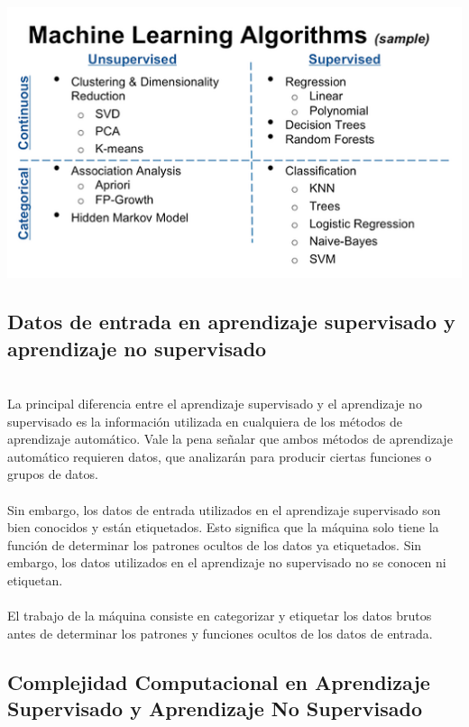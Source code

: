 \documentclass[11pt,a4paper]{article}
\begin{document}
	    \begin{center}	\includegraphics[scale=0.9]{./Imagenes/Diferencias}	
		\end{center}
	
		\subsection{Datos de entrada en aprendizaje supervisado y aprendizaje no supervisado}
		
		\\La principal diferencia entre el aprendizaje supervisado y el aprendizaje no supervisado es la información utilizada en cualquiera de los métodos de aprendizaje automático. Vale la pena señalar que ambos métodos de aprendizaje automático requieren datos, que analizarán para producir ciertas funciones o grupos de datos.\\ 
		\\Sin embargo, los datos de entrada utilizados en el aprendizaje supervisado son bien conocidos y están etiquetados. Esto significa que la máquina solo tiene la función de determinar los patrones ocultos de los datos ya etiquetados. Sin embargo, los datos utilizados en el aprendizaje no supervisado no se conocen ni etiquetan.\\
		\\El trabajo de la máquina consiste en categorizar y etiquetar los datos brutos antes de determinar los patrones y funciones ocultos de los datos de entrada.\\
		
		\subsection{Complejidad Computacional en Aprendizaje Supervisado y Aprendizaje No Supervisado}
		
\end{document}
